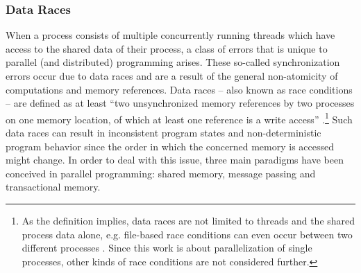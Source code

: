 \subsubsection{Data Races}
When a process consists of multiple concurrently running threads which have access to the shared data of their process, a class of errors that is unique to parallel (and distributed) programming arises. These so-called synchronization errors occur due to data races and are a result of the general non-atomicity of computations and memory references. Data races -- also known as race conditions -- are defined as at least ``two unsynchronized memory references by two processes on one memory location, of which at least one reference is a write access'' \cite[p.~327]{ParallelComputing}.\footnote{As the definition implies, data races are not limited to threads and the shared process data alone, e.g. file-based race conditions can even occur between two different processes \cite{OfficialISC2Guide}. Since this work is about parallelization of single processes, other kinds of race conditions are not considered further.} Such data races can result in inconsistent program states and non-deterministic program behavior since the order in which the concerned memory is accessed might change. In order to deal with this issue, three main paradigms have been conceived in parallel programming: shared memory, message passing and transactional memory.


